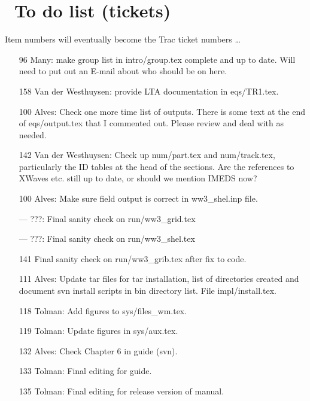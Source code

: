 \pagestyle{myheadings} \setcounter{page}{1} \setcounter{footnote}{0}

\section{~To do list (tickets)} \label{app:to_do}
\newcounters 
\vssub

\noindent
Item numbers will eventually become the Trac ticket numbers \ldots

\begin{itemize}

\item[96] Many: make group list in intro/group.tex complete and up to
  date. Will need to put out an E-mail about who should be on here.

\item[158] Van der Westhuysen: provide LTA documentation in eqs/TR1.tex.

\item[100] Alves: Check one more time list of outputs. There is some text at
  the end of eqs/output.tex that I commented out. Please review and deal with
  as needed.

\item[142] Van der Westhuysen: Check up num/part.tex and num/track.tex,
  particularly the ID tables at the head of the sections. Are the references to
  XWaves etc. still up to date, or should we mention IMEDS now?

\item[100] Alves: Make sure field output is correct in ww3\_shel.inp file.

\item[---] ???: Final sanity check on run/ww3\_grid.tex

\item[---] ???: Final sanity check on run/ww3\_shel.tex

\item[141] Final sanity check on run/ww3\_grib.tex after fix to code.

\item[111] Alves: Update tar files for tar installation, list of directories
  created and document svn install scripts in bin directory list. File
  impl/install.tex. 


\item[118] Tolman: Add figures to sys/files\_wm.tex.

\item[119] Tolman: Update figures in sys/aux.tex.

\item [132] Alves: Check Chapter 6 in guide (svn).

\item [133] Tolman: Final editing for guide. 

\item [135] Tolman: Final editing for release version of manual.

\end{itemize}

\bpage
\pagestyle{empty}
